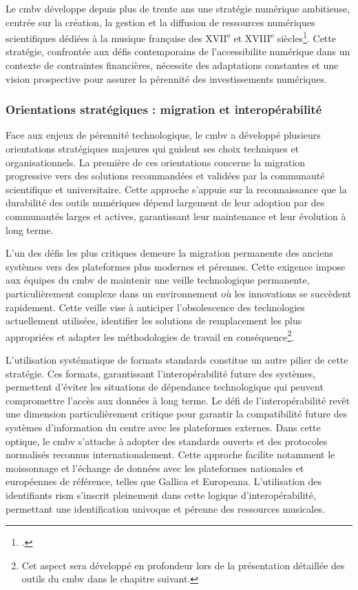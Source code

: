 Le \gls{cmbv} développe depuis plus de trente ans une stratégie numérique ambitieuse, centrée sur la création, la gestion et la diffusion de ressources numériques scientifiques dédiées à la musique française des XVII\textsuperscript{e} et XVIII\textsuperscript{e} siècles\footcite{RessourcesNumeriquesCentre}. Cette stratégie, confrontée aux défis contemporains de l'\gls{accessibilite} numérique dans un contexte de contraintes financières, nécessite des adaptations constantes et une vision prospective pour assurer la pérennité des investissements numériques.

\subsubsection{Orientations stratégiques : migration et interopérabilité}

Face aux enjeux de pérennité technologique, le \gls{cmbv} a développé plusieurs orientations stratégiques majeures qui guident ses choix techniques et organisationnels. La première de ces orientations concerne la migration progressive vers des solutions recommandées et validées par la communauté scientifique et universitaire. Cette approche s'appuie sur la reconnaissance que la durabilité des outils numériques dépend largement de leur adoption par des communautés larges et actives, garantissant leur maintenance et leur évolution à long terme.

L'un des défis les plus critiques demeure la migration permanente des anciens systèmes vers des plateformes plus modernes et pérennes. Cette exigence impose aux équipes du \gls{cmbv} de maintenir une veille technologique permanente, particulièrement complexe dans un environnement où les innovations se succèdent rapidement. Cette veille vise à anticiper l'obsolescence des technologies actuellement utilisées, identifier les solutions de remplacement les plus appropriées et adapter les méthodologies de travail en conséquence\footnote{Cet aspect sera développé en profondeur lors de la présentation détaillée des outils du \gls{cmbv} dans le chapitre suivant.}.

L'utilisation systématique de formats standards constitue un autre pilier de cette stratégie. Ces formats, garantissant l'interopérabilité future des systèmes, permettent d'éviter les situations de dépendance technologique qui peuvent compromettre l'accès aux données à long terme. Le défi de l'interopérabilité revêt une dimension particulièrement critique pour garantir la compatibilité future des systèmes d'information du centre avec les plateformes externes. Dans cette optique, le \gls{cmbv} s'attache à adopter des standards ouverts et des protocoles normalisés reconnus internationalement. Cette approche facilite notamment le moissonnage et l'échange de données avec les plateformes nationales et européennes de référence, telles que Gallica et Europeana. L'utilisation des identifiants \gls{rism} s'inscrit pleinement dans cette logique d'interopérabilité, permettant une identification univoque et pérenne des ressources musicales.


